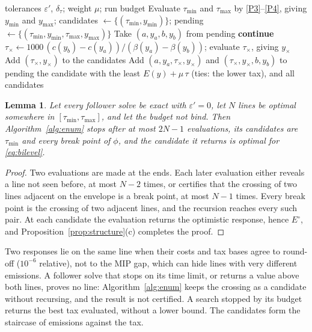 \documentclass[review,11pt,nonatbib]{elsarticle}
\newtheorem{lemma}{Lemma}
\theoremstyle{remark}
\newcommand{\tmin}{\tau_{\min}}
\newcommand{\tmax}{\tau_{\max}}
\begin{document}
\begin{algorithm}[!htbp]
\caption{Enumeration of the switching prices.}\label{alg:enum}
\begin{algorithmic}[1]
\Require tolerances $\varepsilon'$, $\delta_\tau$; weight $\mu$; run budget
\State Evaluate $\tmin$ and $\tmax$ by \eqref{P3}--\eqref{P4}, giving $y_{\min}$ and $y_{\max}$; candidates $\gets \{(\tmin, y_{\min})\}$; pending $\gets \{(\tmin, y_{\min}, \tmax, y_{\max})\}$
  \State Take $(a, y_a, b, y_b)$ from pending
   \textbf{continue} \EndIf
  \State $\tau_\times \gets 1000\,(c(y_b) - c(y_a))/(\beta(y_a) - \beta(y_b))$; evaluate $\tau_\times$, giving $y_\times$
     \State Add $(\tau_\times, y_\times)$ to the candidates 
  \Else
     \State Add $(a, y_a, \tau_\times, y_\times)$ and $(\tau_\times, y_\times, b, y_b)$ to pending
  \EndIf
\EndWhile
\State \Return the candidate with the least $E(y) + \mu\,\tau$ (ties: the lower tax), and all candidates
\end{algorithmic}
\end{algorithm}

\begin{lemma}\label{lem:enum}
Let every follower solve be exact with $\varepsilon' = 0$, let $N$ lines be optimal somewhere in $[\tmin, \tmax]$, and let the budget not bind. Then Algorithm~\ref{alg:enum} stops after at most $2N - 1$ evaluations, its candidates are $\tmin$ and every break point of $\phi$, and the candidate it returns is optimal for \eqref{eq:bilevel}.
\end{lemma}
\begin{proof}
Two evaluations are made at the ends. Each later evaluation either reveals a line not seen before, at most $N - 2$ times, or certifies that the crossing of two lines adjacent on the envelope is a break point, at most $N - 1$ times. Every break point is the crossing of two adjacent lines, and the recursion reaches every such pair. At each candidate the evaluation returns the optimistic response, hence $E^\circ$, and Proposition~\ref{prop:structure}(c) completes the proof.
\end{proof}

Two responses lie on the same line when their costs and tax bases agree to round-off ($10^{-6}$ relative), not to the MIP gap, which can hide lines with very different emissions. A follower solve that stops on its time limit, or returns a value above both lines, proves no line: Algorithm~\ref{alg:enum} keeps the crossing as a candidate without recursing, and the result is not certified. A search stopped by its budget returns the best tax evaluated, without a lower bound. The candidates form the staircase of emissions against the tax.
\end{document}
